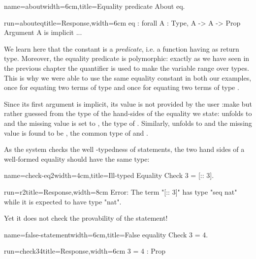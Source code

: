\begin{coq}{name=about}{width=6cm,title=Equality predicate}
About eq.
$~$
\end{coq}
\begin{coqout}{run=abouteq}{title=Response,width=6cm}
eq : forall A : Type, A -> A -> Prop
Argument A is implicit ...
\end{coqout}

We learn here that the constant  is a \emph{predicate}, i.e. a
function having  as return type. Moreover, the equality
predicate is polymorphic: exactly as we have seen in the previous
chapter the  quantifier is used to make the variable 
range over types. This is why we were able to use the same equality
constant in both our examples, once for equating two terms of type
 and once for equating two terms of type .

Since its first argument is implicit, its value is not provided by the
user%
:make
but
rather guessed from the type of the hand-sides of the equality we state:  unfolds to  and the missing value is set to
, the type of . Similarly, 
unfolds to  and the missing value is found
to be , the common type of  and .

As the \Coq{} system checks the well -typedness of statements,
the two hand sides of a well-formed equality should have the same
type:

\begin{coq}{name=check-eq2}{width=4cm,title=Ill-typed Equality}
Check 3 = [:: 3].
$~$
\end{coq}
\begin{coqout}{run=r2}{title=Response,width=8cm}
Error: The term "[:: 3]" has type "seq nat"
 while it is expected to have type "nat".
\end{coqout}

Yet it does not check the provability of the statement!

\begin{coq}{name=false-statement}{width=6cm,title=False equality}
Check 3 = 4.
\end{coq}
\begin{coqout}{run=check34}{title=Response,width=6cm}
3 = 4 : Prop
\end{coqout}


